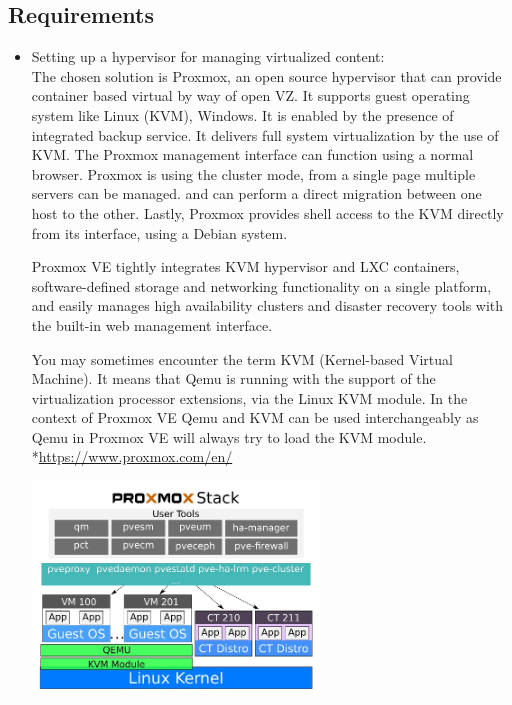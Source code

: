 \subsection{Requirements}
\begin{itemize}
\vspace{0.5cm}

\item
  Setting up a hypervisor for managing virtualized content: \\

  The chosen solution is Proxmox, an open source hypervisor that can provide container based virtual by way of open VZ.
  It supports guest operating system like Linux (KVM), Windows. It is enabled by the presence of integrated backup service.
  It delivers full system virtualization by the use of KVM.
  The Proxmox management interface can function using a normal browser.
  Proxmox is using the cluster mode, from a single page multiple servers can be managed.
  and can perform a direct migration between one host to the other.
  Lastly, Proxmox provides shell access to the KVM directly from its interface, using a Debian system. 

  Proxmox VE tightly integrates KVM hypervisor and LXC
  containers, software-defined storage and networking functionality on a
  single platform, and easily manages high availability clusters and
  disaster recovery tools with the built-in web management interface.

  You may sometimes encounter the term KVM (Kernel-based Virtual Machine).
  It means that Qemu is running with the support of the virtualization
  processor extensions, via the Linux KVM module. In the context of
  Proxmox VE Qemu and KVM can be used interchangeably as Qemu in Proxmox
  VE will always try to load the KVM module.
  \\ 
  *\url{https://www.proxmox.com/en/}

  \begin{center}

  \includegraphics[width=0.6\textwidth]{images/proxmox-stack-example.jpg}


\end{center}
\end{itemize}
